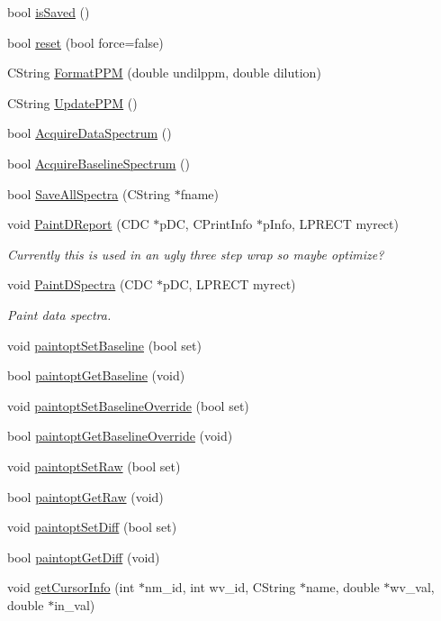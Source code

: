 \begin{DoxyCompactItemize}
\item 
bool \hyperlink{classCDlgBarAcq_ab952538e325b58abc12b681bded919d2}{isSaved} ()
\item 
bool \hyperlink{classCDlgBarAcq_a6bfbcdc6936d72e947838998d9e9ebb8}{reset} (bool force=false)
\item 
CString \hyperlink{classCDlgBarAcq_ae5e972970814308b6d04e98657d45ada}{FormatPPM} (double undilppm, double dilution)
\item 
CString \hyperlink{classCDlgBarAcq_ab996c3a76858d9c20a5d4833815c09c7}{UpdatePPM} ()
\item 
bool \hyperlink{classCDlgBarAcq_a6d5e5f1f1fa2f97ba04ea3be8ac3679e}{AcquireDataSpectrum} ()
\item 
bool \hyperlink{classCDlgBarAcq_a05b96a85e54360b98d96b74f6277b009}{AcquireBaselineSpectrum} ()
\item 
bool \hyperlink{classCDlgBarAcq_a0f2aeeaa2afe8d63d55469dc45b16513}{SaveAllSpectra} (CString $\ast$fname)
\item 
void \hyperlink{classCDlgBarAcq_ac627ea00f15fe6cfbd47942f9aa082c3}{PaintDReport} (CDC $\ast$pDC, CPrintInfo $\ast$pInfo, LPRECT myrect)
\begin{DoxyCompactList}\small\item\em Currently this is used in an ugly three step wrap so maybe optimize? \item\end{DoxyCompactList}\item 
void \hyperlink{classCDlgBarAcq_ac99c44c4d6e2362cdb944c8fdd204fbd}{PaintDSpectra} (CDC $\ast$pDC, LPRECT myrect)
\begin{DoxyCompactList}\small\item\em Paint data spectra. \item\end{DoxyCompactList}\item 
void \hyperlink{classCDlgBarAcq_a6df22383a10efad72789bb5bf99042d0}{paintoptSetBaseline} (bool set)
\item 
bool \hyperlink{classCDlgBarAcq_acb78c4ace755afc8034f22eba727cfec}{paintoptGetBaseline} (void)
\item 
void \hyperlink{classCDlgBarAcq_aca70303ee0efc2ffd4001baef8a55848}{paintoptSetBaselineOverride} (bool set)
\item 
bool \hyperlink{classCDlgBarAcq_adf6da52fec34c903c61c4253a83b65eb}{paintoptGetBaselineOverride} (void)
\item 
void \hyperlink{classCDlgBarAcq_a773637f76c5647e3295b8e422a66b57a}{paintoptSetRaw} (bool set)
\item 
bool \hyperlink{classCDlgBarAcq_a29eb516c45fd3a6498643fe88c935f4e}{paintoptGetRaw} (void)
\item 
void \hyperlink{classCDlgBarAcq_a9b6278778edbe68656ce3e5b53d13643}{paintoptSetDiff} (bool set)
\item 
bool \hyperlink{classCDlgBarAcq_ac1b8ace23acc9cbb2cd34f10d05513f8}{paintoptGetDiff} (void)
\item 
void \hyperlink{classCDlgBarAcq_a3e60127515308e73eb3147a6fb6a74dd}{getCursorInfo} (int $\ast$nm\_\-id, int wv\_\-id, CString $\ast$name, double $\ast$wv\_\-val, double $\ast$in\_\-val)
\end{DoxyCompactItemize}
